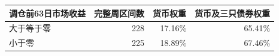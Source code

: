 \begin{tabular}{lrrr}
\toprule
调仓前63日市场收益 & 完整周区间数 & 货币权重 & 货币及三只债券权重\\\midrule
大于等于零 & 228 & 17.16\% & 65.41\%\\
小于零 & 225 & 18.89\% & 67.46\%\\
\bottomrule
\end{tabular}